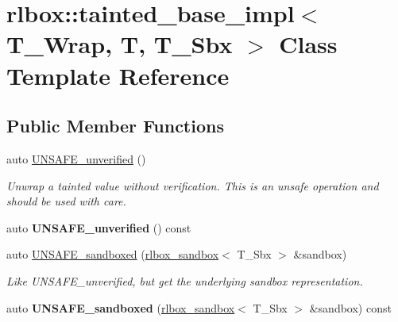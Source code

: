 \hypertarget{classrlbox_1_1tainted__base__impl}{}\section{rlbox\+:\+:tainted\+\_\+base\+\_\+impl$<$ T\+\_\+\+Wrap, T, T\+\_\+\+Sbx $>$ Class Template Reference}
\label{classrlbox_1_1tainted__base__impl}
\subsection*{Public Member Functions}
\begin{DoxyCompactItemize}
\item 
\mbox{\label{classrlbox_1_1tainted__base__impl_a01acab6b4bd8137afa03cf4b2678844f}} 
auto \hyperlink{classrlbox_1_1tainted__base__impl_a01acab6b4bd8137afa03cf4b2678844f}{U\+N\+S\+A\+F\+E\+\_\+unverified} ()
\begin{DoxyCompactList}\small\item\em Unwrap a tainted value without verification. This is an unsafe operation and should be used with care. \end{DoxyCompactList}\item 
\mbox{\label{classrlbox_1_1tainted__base__impl_a41f8eed43072bf173cce34cd3351191e}} 
auto {\bfseries U\+N\+S\+A\+F\+E\+\_\+unverified} () const
\item 
auto \hyperlink{classrlbox_1_1tainted__base__impl_ae2c69129cbb9344e7d2623129f031214}{U\+N\+S\+A\+F\+E\+\_\+sandboxed} (\hyperlink{classrlbox_1_1rlbox__sandbox}{rlbox\+\_\+sandbox}$<$ T\+\_\+\+Sbx $>$ \&sandbox)
\begin{DoxyCompactList}\small\item\em Like U\+N\+S\+A\+F\+E\+\_\+unverified, but get the underlying sandbox representation. \end{DoxyCompactList}\item 
\mbox{\label{classrlbox_1_1tainted__base__impl_a2fb81eab8dc3839f351d6d89410c2350}} 
auto {\bfseries U\+N\+S\+A\+F\+E\+\_\+sandboxed} (\hyperlink{classrlbox_1_1rlbox__sandbox}{rlbox\+\_\+sandbox}$<$ T\+\_\+\+Sbx $>$ \&sandbox) const
\item 

\end{DoxyCompactItemize}
